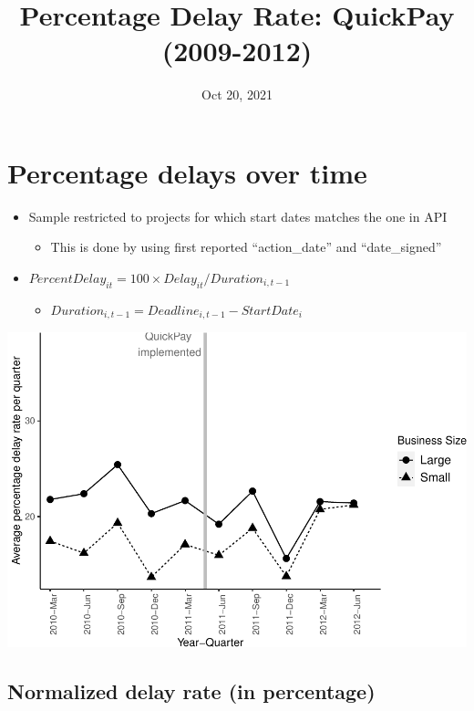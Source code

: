 \documentclass[
]{article}
\title{Percentage Delay Rate: QuickPay (2009-2012)}
\author{}
\date{\vspace{-2.5em}Oct 20, 2021}
\providecommand{\tightlist}{%
  \setlength{\itemsep}{0pt}\setlength{\parskip}{0pt}}
\begin{document}
\maketitle

\hypertarget{percentage-delays-over-time}{%
\section{Percentage delays over
time}\label{percentage-delays-over-time}}

\begin{itemize}
\tightlist
\item
  Sample restricted to projects for which start dates matches the one in
  API

  \begin{itemize}
  \tightlist
  \item
    This is done by using first reported ``action\_date'' and
    ``date\_signed''
  \end{itemize}
\item
  \(PercentDelay_{it}=100 \times Delay_{it}/Duration_{i,t-1}\)

  \begin{itemize}
  \tightlist
  \item
    \(Duration_{i,t-1} = Deadline_{i,t-1} - StartDate_i\)
  \end{itemize}
\end{itemize}

\includegraphics{qp_first_pc_delay_files/figure-latex/plot_pc_delay-1.pdf}

\hypertarget{normalized-delay-rate-in-percentage}{%
\subsection{Normalized delay rate (in
percentage)}\label{normalized-delay-rate-in-percentage}}
\end{document}
